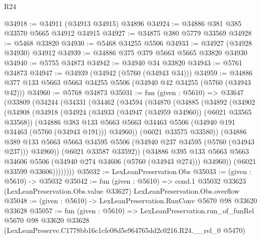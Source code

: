 \begin{lexlean}{R24}
\begin{coremodule}
@34918 := @34911 (@34913 @34915) @34896
@34924 := @34886 @381 @385 @33570 @5665 @34912 @34915
@34927 := @34875 @380 @5779 @33569
@34928 := @5468 @33820
@34930 := @5468 @34255 @5506
@34933 := @34927 (@34928 @34930) @34912
@34939 := @34886 @375 @379 @5663 @5665 @33820 @34930
@34940 := @5755 @34873
@34942 := @34940 @34 @33820
@34943 := @5761 @34873
@34947 := @34939 (@34942 (@5760 (@34943 @34)))
@34959 := @34886 @377 @133 @5663 @5663 @34255 @5506 (@34940 @42 @34255 (@5760 (@34943 @42)))
@34960 := @5768 @34873
@35031 := fun (given : @5610) =>
  @33647
    (@33809
      (@34244
        (@34331
          (@34462
            (@34594
              (@34870
                (@34885
                  (@34892
                    (@34902
                      (@34908
                        (@34918
                          (@34924
                            (@34933 (@34947 (@34959 @34960)) (@6021 @33565 @33568))
                            (@34886
                              @383
                              @133
                              @5663
                              @5663
                              @34463
                              @5506
                              (@34940 @191 @34463 (@5760 (@34943 @191)))
                              @34960))
                          (@6021 @33575 @33580))
                        (@34886
                          @389
                          @133
                          @5663
                          @5663
                          @34595
                          @5506
                          (@34940 @237 @34595 (@5760 (@34943 @237)))
                          @34960))
                      (@6021 @33587 @33592))
                    (@34886
                      @395
                      @133
                      @5663
                      @5663
                      @34606
                      @5506
                      (@34940 @274 @34606 (@5760 (@34943 @274)))
                      @34960))
                  (@6021 @33599 @33606))))))))
@35032 := LexLeanPreservation.Obs
@35033 := (given : @5610) -> @35032
@35042 := fun (given : @5610) =>
  cond.{1} @35032 @33623 (LexLeanPreservation.Obs.value @33627) LexLeanPreservation.Obs.overflow
@35048 := (given : @5610) -> LexLeanPreservation.RunConv @5670 @98 @33620 @33628
@35057 := fun (given : @5610) =>
  LexLeanPreservation.run_of_funRel
    @5670
    @98
    @33620
    @33628
    (LexLeanPreserve.C1778bb16c1cfe08d5e964765dd2c0216.R24.__rel_0 @5470)
\end{coremodule}
\end{lexlean}
